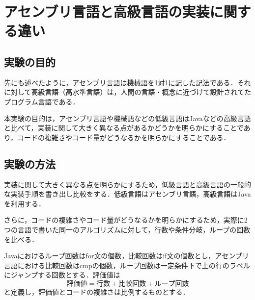 \section{アセンブリ言語と高級言語の実装に関する違い}
\subsection{実験の目的}
先にも述べたように，アセンブリ言語は機械語を1対1に記した記法である．それに対して高級言語（高水準言語）は，人間の言語・概念に近づけて設計されてたプログラム言語である．\cite{高水準言語}\par
本実験の目的は，アセンブリ言語や機械語などの低級言語は{\ttfamily Java}などの高級言語と比べて，実装に関して大きく異なる点があるかどうかを明らかにすることであり，コードの複雑さやコード量がどうなるかを明らかにすることである．
\subsection{実験の方法}
実装に関して大きく異なる点を明らかにするため，低級言語と高級言語の一般的な実装手順を書き出し比較をする．低級言語はアセンブリ言語，高級言語は{\ttfamily Java}を利用する．\par
さらに，コードの複雑さやコード量がどうなるかを明らかにするため，実際に2つの言語で書いた同一のアルゴリズムに対して，行数や条件分岐，ループの回数を比べる．\par
{\ttfamily Java}におけるループ回数は{\ttfamily for}文の個数，比較回数は{\ttfamily if}文の個数とし，アセンブリ言語における比較回数は{\ttfamily cmp}の個数，ループ回数は一定条件下で上の行のラベルにジャンプする回数とする．評価値は
\[評価値=行数+比較回数+ループ回数\]と定義し，評価値とコードの複雑さは比例するものとする．
